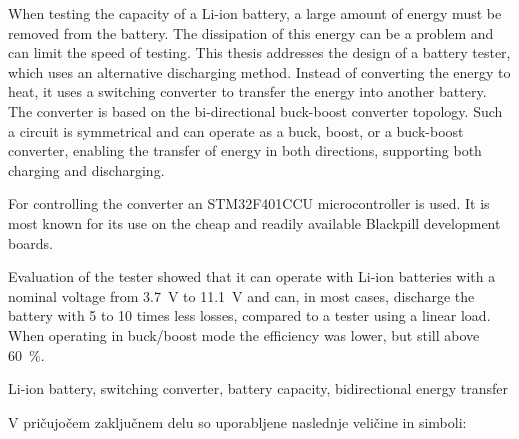 \documentclass[a4paper,twoside,openright,12pt,slovene]{book}
\begin{document}

\abstract
When testing the capacity of a Li-ion battery, a large amount of energy must be removed from the battery.
The dissipation of this energy can be a problem and can limit the speed of testing.
This thesis addresses the design of a battery tester, which uses an alternative discharging method.
Instead of converting the energy to heat, it uses a switching converter to transfer the energy into another battery.
The converter is based on the bi-directional buck-boost converter topology.
Such a circuit is symmetrical and can operate as a buck, boost, or a buck-boost converter,
enabling the transfer of energy in both directions, supporting both charging and discharging.

For controlling the converter an STM32F401CCU microcontroller is used.
It is most known for its use on the cheap and readily available Blackpill development boards.

Evaluation of the tester showed that it can operate with Li-ion batteries with a nominal voltage from 3.7~V to 11.1~V
and can, in most cases, discharge the battery with 5 to 10 times less losses, compared to a tester using a linear load.
When operating in buck/boost mode the efficiency was lower, but still above 60~\%.

\keywords
Li-ion battery, switching converter, battery capacity, bidirectional energy transfer


\tableofcontents

\seznamslik

\seznamtabel

\seznamsimbolov
V pričujočem zaključnem delu so uporabljene naslednje veličine in simboli:
\end{document}

